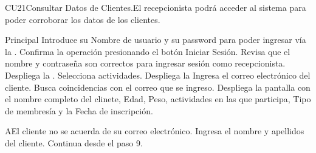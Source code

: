 

\begin{UseCase}{CU21}{Consultar Datos de Clientes.}{El recepcionista podrá acceder al sistema para poder corroborar los datos de los clientes.}
	\end{UseCase}
	\begin{UCtrayectoria}{Principal}
		\UCpaso[\UCactor] Introduce su Nombre de usuario y su password para poder ingresar vía la  \label{CU1LoginJI}.
		\UCpaso[\UCactor] Confirma la operación presionando el botón Iniciar Sesión.
		\UCpaso Revisa que el nombre y contraseña son correctos para ingresar sesión como recepcionista.
		\UCpaso Despliega la .
		\UCpaso[\UCactor]Selecciona actividades.
		\UCpaso Despliega la 
		\UCpaso[\UCactor]Ingresa el correo electrónico del cliente.
		\UCpaso Busca coincidencias con el correo que se ingreso.
		\UCpaso Despliega la pantalla con el nombre completo del clinete, Edad, Peso, actividades en las que participa, Tipo de membresía y la Fecha de inscripción.
	\end{UCtrayectoria}

		\begin{UCtrayectoriaA}{A}{El cliente no se acuerda de su correo electrónico.}
			\UCpaso[\UCactor] Ingresa el nombre y apellidos del cliente.
			\UCpaso Continua desde el paso 9.
		\end{UCtrayectoriaA}